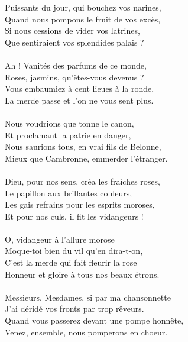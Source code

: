 \breakpage
Puissants du jour, qui bouchez vos narines,
\\Quand nous pompons le fruit de vos excès,
\\Si nous cessions de vider vos latrines,
\\Que sentiraient vos splendides palais ?
\\\\Ah ! Vanités des parfums de ce monde,
\\Roses, jasmins, qu'êtes-vous devenus ?
\\Vous embaumiez à cent lieues à la ronde,
\\La merde passe et l'on ne vous sent plus.
\\\\Nous voudrions que tonne le canon,
\\Et proclamant la patrie en danger,
\\Nous saurions tous, en vrai fils de Belonne,
\\Mieux que Cambronne, emmerder l'étranger.
\\\\Dieu, pour nos sens, créa les fraîches roses,
\\Le papillon aux brillantes couleurs,
\\Les gais refrains pour les esprits moroses,
\\Et pour nos culs, il fit les vidangeurs !
\\\\O, vidangeur à l'allure morose
\\Moque-toi bien du vil qu'en dira-t-on,
\\C'est la merde qui fait fleurir la rose
\\Honneur et gloire à tous nos beaux étrons.
\\\\Messieurs, Mesdames, si par ma chansonnette
\\J'ai déridé vos fronts par trop rêveurs.
\\Quand vous passerez devant une pompe honnête,
\\Venez, ensemble, nous pomperons en choeur.

\breakpage